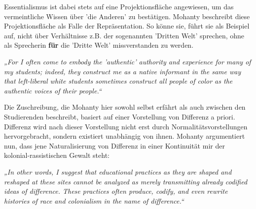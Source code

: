 Essentialismus ist dabei stets
auf eine Projektionsfläche angewiesen, um das vermeintliche Wissen über 'die
Anderen' zu bestätigen. Mohanty beschreibt diese Projektionsfläche als Falle
der Repräsentation\footnotemark{}. So könne sie, führt sie als Beispiel auf, nicht über
Verhältnisse z.B. der sogenannten 'Dritten Welt'\footnotemark{} sprechen, ohne als Sprecherin \textbf{für} die 'Dritte Welt' missverstanden
zu werden.

\begin{myenv}
  \textit{
  „For I often come to embody the 'authentic' authority and experience for many
  of my students; indeed, they construct me as a native informant in the same
  way that left-liberal white students sometimes construct all people of color
  as the authentic voices of their people.“\footnotemark {}
    }
\end{myenv}

Die Zuschreibung, die Mohanty hier sowohl selbst erfährt als auch zwischen den
Studierenden beschreibt, basiert auf einer Vorstellung von Differenz a priori.
Differenz wird nach dieser Vorstellung nicht erst durch
Normalitätsvorstellungen hervorgebracht, sondern existiert unabhängig von
ihnen. Mohanty argumentiert nun, dass jene Naturalisierung von Differenz in
einer Kontinuität mir der kolonial-rassistischen Gewalt steht:

\begin{myenv}
  \textit{
    „In other words, I suggest that educational practices as they are shaped
  and reshaped at these sites cannot be analyzed as merely transmitting already
codified ideas of difference. These practices often produce, codify, and even
rewrite histories of race and colonialism in the name of
difference.“\footnotemark {}
    }
\end{myenv}

